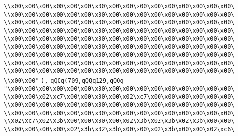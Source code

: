 \verb|\\x00\x00\x00\x00\x00\x00\x00\x00\x00\x00\x00\x00\x00\x00\x00\x00\|\newline
\verb|\\x00\x00\x00\x00\x00\x00\x00\x00\x00\x00\x00\x00\x00\x00\x00\x00\|\newline
\verb|\\x00\x00\x00\x00\x00\x00\x00\x00\x00\x00\x00\x00\x00\x00\x00\x00\|\newline
\verb|\\x00\x00\x00\x00\x00\x00\x00\x00\x00\x00\x00\x00\x00\x00\x00\x00\|\newline
\verb|\\x00\x00\x00\x00\x00\x00\x00\x00\x00\x00\x00\x00\x00\x00\x00\x00\|\newline
\verb|\\x00\x00\x00\x00\x00\x00\x00\x00\x00\x00\x00\x00\x00\x00\x00\x00\|\newline
\verb|\\x00\x00\x00\x00\x00\x00\x00\x00\x00\x00\x00\x00\x00\x00\x00\x00\|\newline
\verb|\\x00\x00\x00\x00\x00\x00\x00\x00\x00\x00\x00\x00\x00\x00\x00\x00\|\newline
\verb|\\x00\x00\x00\x00\x00\x00\x00\x00\x00\x00\x00\x00\x00\x00\x00\x00\|\newline
\verb|\\x00\x00"|\newline
\verb|),|\newline
\verb|qQQq(709,qQQq129,qQQq|\newline
\verb|"\x00\x00\x00\x00\x00\x00\x00\x00\x00\x00\x00\x00\x00\x00\x00\x00\|\newline
\verb|\\x00\x00\x02\xc7\x00\x00\x00\x00\x02\xc7\x00\x00\x00\x00\x00\x00\|\newline
\verb|\\x00\x00\x00\x00\x00\x00\x00\x00\x00\x00\x00\x00\x00\x00\x00\x00\|\newline
\verb|\\x00\x00\x00\x00\x00\x00\x00\x00\x00\x00\x00\x00\x00\x00\x00\x00\|\newline
\verb|\\x02\xc7\x02\x3b\x00\x00\x00\x00\x02\x3b\x02\x3b\x02\x3b\x00\x00\|\newline
\verb|\\x00\x00\x00\x00\x02\x3b\x02\x3b\x00\x00\x02\x3b\x00\x00\x02\xc6\|\newline
